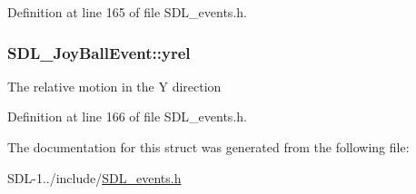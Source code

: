Definition at line 165 of file S\+D\+L\+\_\+events.\+h.

\hypertarget{struct_s_d_l___joy_ball_event_a28ad48a9eb7a5d3ff62ccba09fcead76}{}
\subsubsection[{yrel}]{ S\+D\+L\+\_\+\+Joy\+Ball\+Event\+::yrel}\label{struct_s_d_l___joy_ball_event_a28ad48a9eb7a5d3ff62ccba09fcead76}
The relative motion in the Y direction 

Definition at line 166 of file S\+D\+L\+\_\+events.\+h.



The documentation for this struct was generated from the following file\+:\begin{DoxyCompactItemize}
\item 
S\+D\+L-\/1../include/\hyperlink{_s_d_l__events_8h}{S\+D\+L\+\_\+events.\+h}\end{DoxyCompactItemize}
